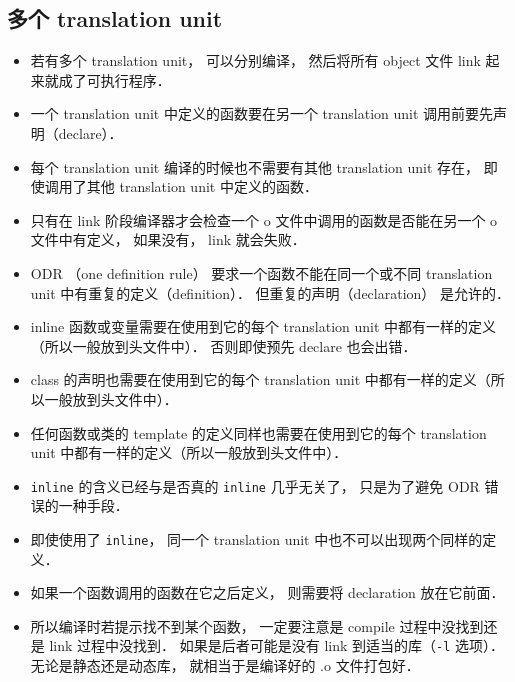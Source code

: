 \subsection{多个  translation unit}
\begin{itemize}
\item 若有多个 translation unit， 可以分别编译， 然后将所有 object 文件 link 起来就成了可执行程序．
\item 一个 translation unit 中定义的函数要在另一个 translation unit 调用前要先声明（declare）．
\item 每个 translation unit 编译的时候也不需要有其他 translation unit 存在， 即使调用了其他 translation unit 中定义的函数．
\item 只有在 link 阶段编译器才会检查一个 o 文件中调用的函数是否能在另一个 o 文件中有定义， 如果没有， link 就会失败．
\item ODR （one definition rule） 要求一个函数不能在同一个或不同 translation unit 中有重复的定义（definition）． 但重复的声明（declaration） 是允许的．
\item inline 函数或变量需要在使用到它的每个 translation unit 中都有一样的定义（所以一般放到头文件中）． 否则即使预先 declare 也会出错．
\item class 的声明也需要在使用到它的每个 translation unit 中都有一样的定义（所以一般放到头文件中）．
\item 任何函数或类的 template 的定义同样也需要在使用到它的每个 translation unit 中都有一样的定义（所以一般放到头文件中）．
\item \verb|inline| 的含义已经与是否真的 \verb|inline| 几乎无关了， 只是为了避免 ODR 错误的一种手段．
\item 即使使用了 \verb|inline|， 同一个 translation unit 中也不可以出现两个同样的定义．
\item 如果一个函数调用的函数在它之后定义， 则需要将 declaration 放在它前面．
\item 所以编译时若提示找不到某个函数， 一定要注意是 compile 过程中没找到还是 link 过程中没找到． 如果是后者可能是没有 link 到适当的库（\verb|-l| 选项）． 无论是静态还是动态库， 就相当于是编译好的 .o 文件打包好．
\end{itemize}
